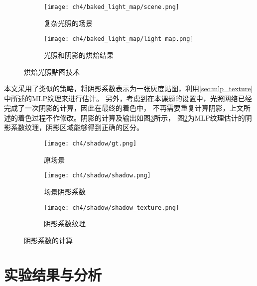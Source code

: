 \begin{figure}[H]
  \centering
  \begin{subfigure}[t]{0.45\textwidth}
    \centering
    \texttt{[image: ch4/baked\_light\_map/scene.png]}
    \caption{复杂光照的场景}
  \end{subfigure}
  \hspace{0.05\textwidth} %
  \begin{subfigure}[t]{0.45\textwidth}
    \centering
    \texttt{[image: ch4/baked\_light\_map/light map.png]}
    \caption{光照和阴影的烘焙结果}
  \end{subfigure}
  \caption{烘焙光照贴图技术}
  \label{fig:baked_light_map}
\end{figure}

本文采用了类似的策略，将阴影系数表示为一张灰度贴图，利用\ref{sec:mlp_texture}中所述的MLP纹理来进行估计。
另外，考虑到在本课题的设置中，光照网络已经完成了一次阴影的计算，因此在最终的着色中，
不再需要重复计算阴影，上文所述的着色过程不作修改。阴影的计算及输出如图\ref{fig:shadow_mapping}所示，
图\ref{fig:shadow_map_by_mlp}为MLP纹理估计的阴影系数纹理，阴影区域能够得到正确的区分。

\begin{figure}[H]
  \centering
  \begin{subfigure}[c]{0.27\textwidth}
    \centering
    \texttt{[image: ch4/shadow/gt.png]}
    \caption{原场景}
  \end{subfigure}
  \hspace{0.05\textwidth} %
  \begin{subfigure}[c]{0.27\textwidth}
    \centering
    \texttt{[image: ch4/shadow/shadow.png]}
    \caption{场景阴影系数}
  \end{subfigure}
  \hspace{0.05\textwidth} %
  \begin{subfigure}[c]{0.27\textwidth}
    \centering
    \texttt{[image: ch4/shadow/shadow\_texture.png]}
    \caption{阴影系数纹理}
    \label{fig:shadow_map_by_mlp}
  \end{subfigure}
  \caption{阴影系数的计算}
  \label{fig:shadow_mapping}
\end{figure}

\section{实验结果与分析}

